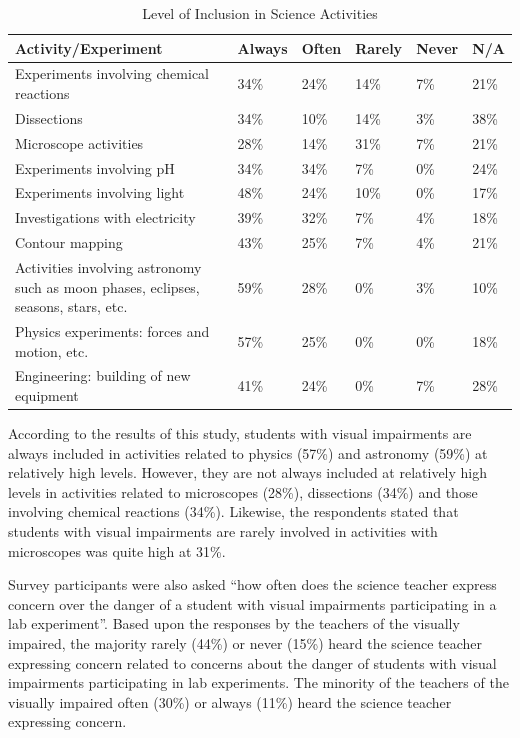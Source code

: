 \documentclass[11.5pt]{sig-alternate} %
\begin{document}
\begin{large}
\begin{table}[t]
\caption{Level of Inclusion in Science Activities}
\begin{tabular}{llllll}
\hline
Activity/Experiment & Always & Often & Rarely & Never & N/A \\ \hline
Experiments involving chemical reactions & 34\%	& 24\% & 14\% & 7\% & 21\% \\
Dissections & 34\% & 10\% & 14\% & 3\% & 38\% \\
Microscope activities & 28\% & 14\% & 31\% & 7\% & 21\% \\
Experiments involving pH & 34\% & 34\% & 7\% & 0\% & 24\% \\
Experiments involving light & 48\% & 24\% & 10\% & 0\% & 17\% \\
Investigations with electricity & 39\% & 32\% & 7\% & 4\% & 18\% \\
Contour mapping & 43\% & 25\% & 7\% & 4\% & 21\% \\
Activities involving astronomy such as moon phases, eclipses, seasons, stars, etc. & 59\% & 28\% & 0\% & 3\% & 10\% \\
Physics experiments: forces and motion, etc. & 57\% & 25\% & 0\% & 0\% & 18\% \\
Engineering: building of new equipment	& 41\% & 24\% & 0\% & 7\% & 28\% \\ \hline
\end{tabular}
\end{table}

According to the results of this study, students with visual impairments are always included in activities related to physics (57\%) and astronomy (59\%) at relatively high levels.  However, they are not always included at relatively high levels in activities related to microscopes (28\%), dissections (34\%) and those involving chemical reactions (34\%).  Likewise, the respondents stated that students with visual impairments are rarely involved in activities with microscopes was quite high at 31\%.  

Survey participants were also asked “how often does the science teacher express concern over the danger of a student with visual impairments participating in a lab experiment”.  Based upon the responses by the teachers of the visually impaired, the majority rarely (44\%) or never (15\%) heard the science teacher expressing concern related to concerns about the danger of students with visual impairments participating in lab experiments.  The minority of the teachers of the visually impaired often (30\%) or always (11\%) heard the science teacher expressing concern.  


\end{large}
\end{document}

